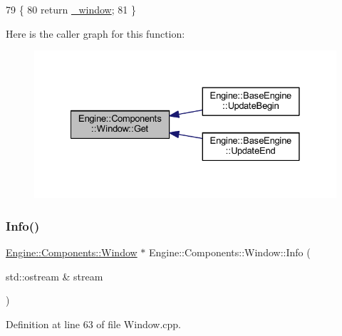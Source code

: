 \begin{DoxyCode}
79 \{
80     \textcolor{keywordflow}{return} \mbox{\hyperlink{classEngine_1_1Components_1_1Window_a4e37d9a51476443d15d9a395d278237a}{\_window}};
81 \}
\end{DoxyCode}
Here is the caller graph for this function\+:
\nopagebreak
\begin{figure}[H]
\begin{center}
\leavevmode
\includegraphics[width=328pt]{classEngine_1_1Components_1_1Window_a4d5c3ff7df28f77bfa330beb447512f8_icgraph}
\end{center}
\end{figure}
\mbox{\label{classEngine_1_1Components_1_1Window_a2fbf92d20aae2e10273b15ad43cc8db8}} 
\subsubsection{\texorpdfstring{Info()}{Info()}}
{\footnotesize\ttfamily \mbox{\hyperlink{classEngine_1_1Components_1_1Window}{Engine\+::\+Components\+::\+Window}} $\ast$ Engine\+::\+Components\+::\+Window\+::\+Info (\begin{DoxyParamCaption}\item[{std\+::ostream \&}]{stream }\end{DoxyParamCaption})}



Definition at line 63 of file Window.\+cpp.



